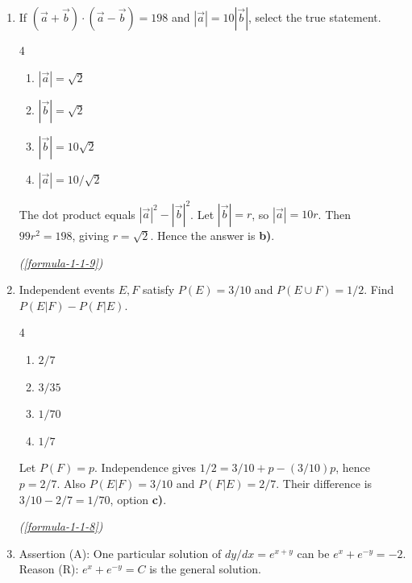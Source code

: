 \begin{enumerate}[label={},leftmargin=1.15cm,labelwidth=1.0cm,labelsep=0.15cm,itemindent=0pt,listparindent=0pt,itemsep=\baselineskip,parsep=0pt,topsep=0pt]
\item[3.1.15] If $(\vec a+\vec b)\cdot(\vec a-\vec b)=198$ and $|\vec a|=10|\vec b|$, select the true statement.

\begin{multicols}{4}
\begin{enumerate}
\setlength{\itemsep}{0pt}
    \item $|\vec a|=\sqrt2$
    \item $|\vec b|=\sqrt2$
    \item $|\vec b|=10\sqrt2$
    \item $|\vec a|=10/\sqrt2$
\end{enumerate}
\end{multicols}

\vspace{0.6em}\par\solution


The dot product equals $|\vec a|^2-|\vec b|^2$. Let $|\vec b|=r$, so $|\vec a|=10r$. Then $99r^2=198$, giving $r=\sqrt2$. Hence the answer is \textbf{b)}.\par\noindent\hfill\mbox{\textit{(\ref{formula-1-1-9})}}\par

\item[3.1.18] Independent events $E,F$ satisfy $P(E)=3/10$ and $P(E\cup F)=1/2$. Find $P(E|F)-P(F|E)$.

\begin{multicols}{4}
\begin{enumerate}
\setlength{\itemsep}{0pt}
    \item $2/7$
    \item $3/35$
    \item $1/70$
    \item $1/7$
\end{enumerate}
\end{multicols}

\vspace{0.6em}\par\solution


Let $P(F)=p$. Independence gives $1/2=3/10+p-(3/10)p$, hence $p=2/7$. Also $P(E|F)=3/10$ and $P(F|E)=2/7$. Their difference is $3/10-2/7=\boxed{1/70}$, option \textbf{c)}.\par\noindent\hfill\mbox{\textit{(\ref{formula-1-1-8})}}\par

\newpage
\item[3.1.19] Assertion (A): One particular solution of $dy/dx=e^{x+y}$ can be $e^x+e^{-y}=-2$. Reason (R): $e^x+e^{-y}=C$ is the general solution.


\end{enumerate}
